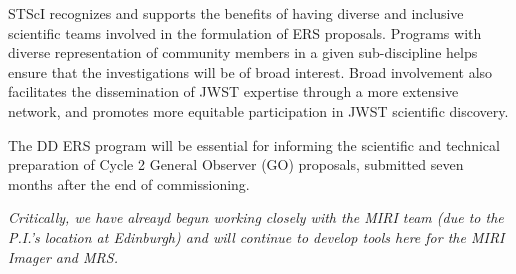 \smallskip \smallskip
\noindent
STScI recognizes and supports the benefits of having diverse and inclusive scientific teams involved in the formulation of ERS proposals.  Programs with diverse representation of community members in a given sub-discipline helps ensure that the investigations will be of broad interest. Broad involvement also facilitates the dissemination of JWST expertise through a more extensive network, and promotes more equitable participation in JWST scientific discovery.

\smallskip \smallskip
\noindent
The DD ERS program will be essential for informing the scientific and technical preparation of Cycle 2 General Observer (GO) proposals, submitted seven months after the end of commissioning.

{\it Critically, we have alreayd begun working closely with the MIRI team (due to the P.I.'s location at Edinburgh) and will continue to develop tools here for the MIRI Imager and MRS.}
